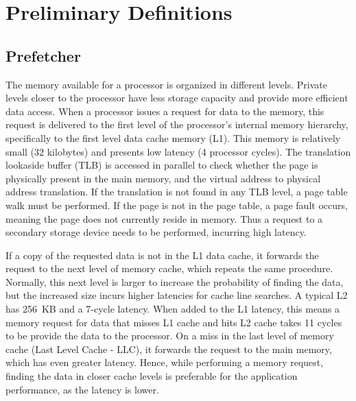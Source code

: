 \documentclass[AMA,final,STIX1COL]{WileyNJD-v2}
\begin{document}
\section{Preliminary Definitions}\label{sec:definitions}



\subsection{Prefetcher}

The memory available for a processor is organized in different levels.
Private levels closer to the processor have less storage capacity and provide more efficient data access. 
When a processor issues a request for data to the memory, this request is delivered to the first level of the processor's internal memory hierarchy, specifically to the first level data cache memory (L1).
This memory is relatively small (32 kilobytes) and presents low latency (4 processor cycles).
The translation lookaside buffer (TLB) is accessed in parallel to check whether the page is physically present in the main memory, and the virtual address to physical address translation.
If the translation is not found in any TLB level, a page table walk must be performed.
If the page is not in the page table, a page fault occurs, meaning the page does not currently reside in memory.
Thus a request to a secondary storage device needs to be performed, incurring high latency.

If a copy of the requested data is not in the L1 data cache, it forwards the request to the next level of memory cache, which repeats the same procedure.
Normally, this next level is larger to increase the probability of finding the data, but the increased size incurs higher latencies for cache line searches.
A typical L2 has 256~KB and a 7-cycle latency.
When added to the L1 latency, this means a memory request for data that misses L1 cache and hits L2 cache takes 11 cycles to be provide the data to the processor.
On a miss in the last level of memory cache (Last Level Cache - LLC), it forwards the request to the main memory, which has even greater latency. 
Hence, while performing a memory request, finding the data in closer cache levels is preferable for the application performance, as the latency is lower.
\end{document}
